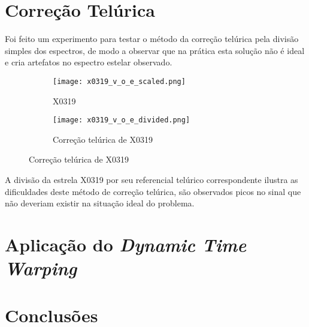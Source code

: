 \documentclass[a1]{sciposter}
\begin{document}
\begin{multicols}{2}
\section{Correção Telúrica}

Foi feito um experimento para testar o método da correção telúrica pela divisão simples dos espectros, de modo a observar que na prática esta solução não é ideal e cria artefatos no espectro estelar observado.

\begin{figure}
 \centering
 \begin{subfigure}{0.4\textwidth}
  \centering
  \texttt{[image: x0319\_v\_o\_e\_scaled.png]}
  \caption{X0319}
 \end{subfigure}\hfil
 \begin{subfigure}{0.4\textwidth}
  \centering
  \texttt{[image: x0319\_v\_o\_e\_divided.png]}
  \caption{Correção telúrica de X0319}
 \end{subfigure}\hfil
\end{figure}

A divisão da estrela X0319 por seu referencial telúrico correspondente ilustra as dificuldades deste método de correção telúrica, são observados picos no sinal que não deveriam existir na situação ideal do problema.

\section{Aplicação do \textit{Dynamic Time Warping}}



\section{Conclusões}


\end{multicols}
\end{document}
